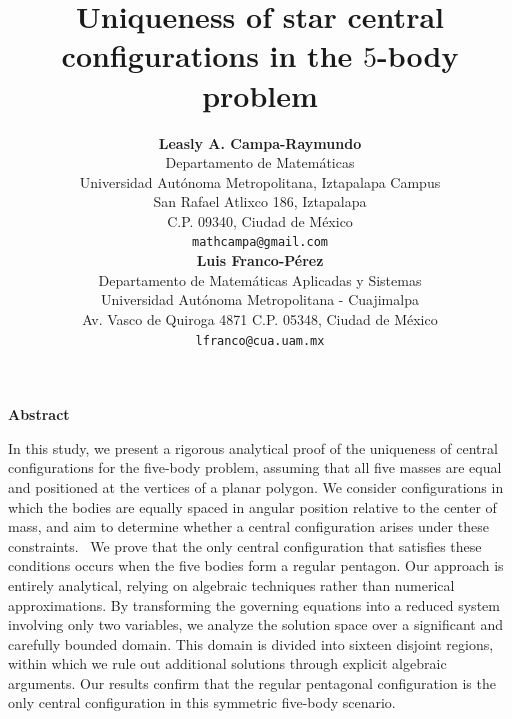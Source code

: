 \documentclass[final,11pt]{article}
\numberwithin{equation}{section}
\theoremstyle{definition}
\begin{document}
\begin{titlepage}
\title{Uniqueness of star central configurations in the $5$-body problem
\hspace{-8mm}
}
\author{
\textbf{Leasly A. Campa-Raymundo}
\\
Departamento de Matem\'aticas\\
Universidad Aut\'onoma Metropolitana, Iztapalapa Campus\\
San Rafael Atlixco 186, Iztapalapa\\
C.P. 09340, Ciudad de M\'exico\\
\texttt{mathcampa@gmail.com}
\\[4mm]
\textbf{Luis Franco-P\'erez}
\\
Departamento de Matem\'aticas Aplicadas y Sistemas\\
Universidad Aut\'onoma Metropolitana - Cuajimalpa\\
Av. Vasco de Quiroga 4871
C.P. 05348, Ciudad de M\'exico\\
\texttt{lfranco@cua.uam.mx}
}
\date{}
\maketitle
\vspace{-4mm}
\begin{center}
\begin{minipage}{5in}
  \centerline{{\bf Abstract}} \bigskip
\large
In this study, we present a rigorous analytical proof of the uniqueness of central configurations for the five-body problem, assuming that all five masses are equal and positioned at the vertices of a planar polygon. We consider configurations in which the bodies are equally spaced in angular position relative to the center of mass, and aim to determine whether a central configuration arises under these constraints. 
We prove that the only central configuration that satisfies these conditions occurs when the five bodies form a regular pentagon. Our approach is entirely analytical, relying on algebraic techniques rather than numerical approximations. By transforming the governing equations into a reduced system involving only two variables, we analyze the solution space over a significant and carefully bounded domain. This domain is divided into sixteen disjoint regions, within which we rule out additional solutions through explicit algebraic arguments.
Our results confirm that the regular pentagonal configuration is the only central configuration in this symmetric five-body scenario.
\normalsize
\end{minipage}
\end{center}
\thispagestyle{empty}
\end{titlepage}
\end{document}
